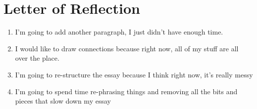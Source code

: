 \newpage

\section*{Letter of Reflection}
\label{sec:letter_of_reflection}

\begin{enumerate}
  \label{enum:letter_of_reflection}

  \item I'm going to add another paragraph, I just didn't have enough time.
  \item I would like to draw connections because right now, all of my stuff are
    all over the place.
  \item I'm going to re-structure the essay because I think right now, it's
    really messy
  \item I'm going to spend time re-phrasing things and removing all the bits and
    pieces that slow down my essay
\end{enumerate}

